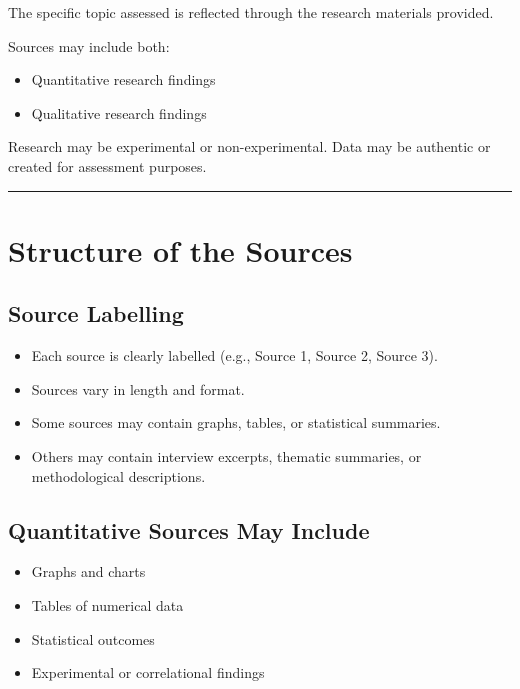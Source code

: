 \documentclass[12pt,a4paper]{article}
\begin{document}
The specific topic assessed is reflected through the research materials provided.

\vspace{1em}

Sources may include both:

\begin{itemize}
    \item Quantitative research findings
    \item Qualitative research findings
\end{itemize}

Research may be experimental or non-experimental.  
Data may be authentic or created for assessment purposes.

\vspace{1em}
\hrule
\vspace{1em}

\section*{Structure of the Sources}

\subsection*{Source Labelling}

\begin{itemize}
    \item Each source is clearly labelled (e.g., Source 1, Source 2, Source 3).
    \item Sources vary in length and format.
    \item Some sources may contain graphs, tables, or statistical summaries.
    \item Others may contain interview excerpts, thematic summaries, or methodological descriptions.
\end{itemize}

\subsection*{Quantitative Sources May Include}

\begin{itemize}
    \item Graphs and charts
    \item Tables of numerical data
    \item Statistical outcomes
    \item Experimental or correlational findings
\end{itemize}
\end{document}
